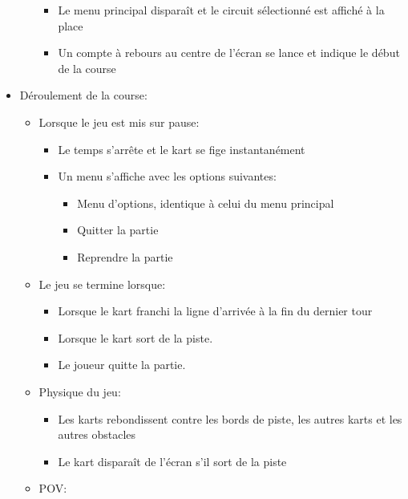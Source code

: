 \documentclass{article}
\begin{document}
\begin{itemize}
\begin{itemize}
\begin{itemize}
                        \item Le menu principal disparaît et le circuit sélectionné est affiché à la place
                        \item Un compte à rebours au centre de l'écran se lance et indique le début de la course
                    \end{itemize}
          \end{itemize}
    \item Déroulement de la course: \begin{itemize}
              \item Lorsque le jeu est mis sur pause: \begin{itemize}
                        \item Le temps s'arrête et le kart se fige instantanément
                        \item Un menu s'affiche avec les options suivantes: \begin{itemize}
                                  \item Menu d'options, identique à celui du menu principal
                                  \item Quitter la partie
                                  \item Reprendre la partie
                              \end{itemize}
                    \end{itemize}
              \item Le jeu se termine lorsque: \begin{itemize}
                        \item Lorsque le kart franchi la ligne d'arrivée à la fin du dernier tour
                        \item Lorsque le kart sort de la piste.
                        \item Le joueur quitte la partie.
                    \end{itemize}
              \item Physique du jeu: \begin{itemize}
                        \item Les karts rebondissent contre les bords de piste, les autres karts et les autres obstacles
                        \item Le kart disparaît de l'écran s'il sort de la piste
                    \end{itemize}
              \item POV: \begin{itemize}

\end{itemize}
\end{itemize}
\end{itemize}
\end{document}
